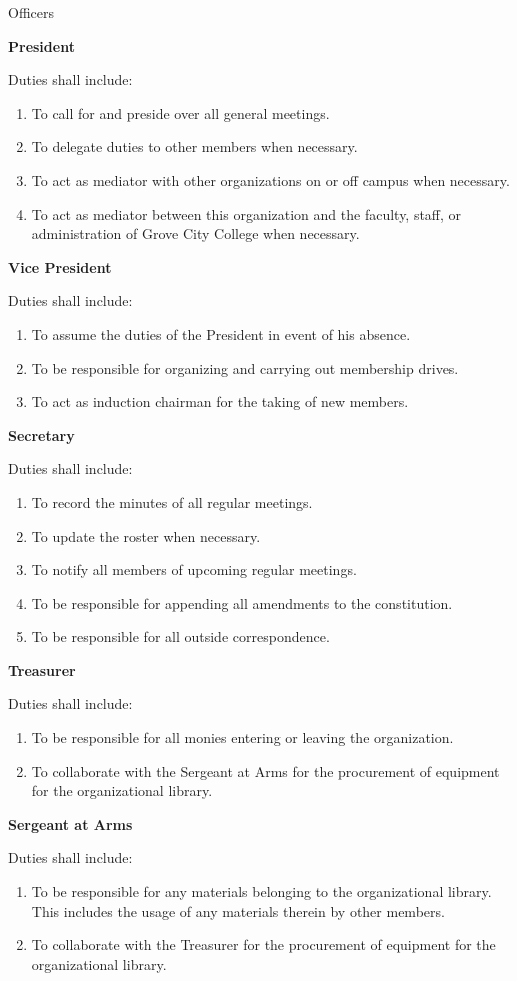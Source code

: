 {
	\begin{article}{Officers}
		\item \textbf{President}
		
		Duties shall include:
		\begin{enumerate}
			\item To call for and preside over all general meetings.
			\item To delegate duties to other members when necessary.
			\item To act as mediator with other organizations on or off campus when necessary. 
			\item To act as mediator between this organization and the faculty, staff, or administration of Grove City College when necessary.
		\end{enumerate}
		\item \textbf{Vice President}
		
		Duties shall include:
		\begin{enumerate}
			\item To assume the duties of the President in event of his absence.
			\item To be responsible for organizing and carrying out membership drives.
			\item To act as induction chairman for the taking of new members.
		\end{enumerate}
		\item \textbf{Secretary}
		
		Duties shall include:
		\begin{enumerate}
			\item To record the minutes of all regular meetings.
			\item To update the roster when necessary.
			\item To notify all members of upcoming regular meetings.
			\item To be responsible for appending all amendments to the constitution.
			\item To be responsible for all outside correspondence.
		\end{enumerate}
		\item \textbf{Treasurer}
		
		Duties shall include:
		\begin{enumerate}
			\item To be responsible for all monies entering or leaving the organization.
			\item To collaborate with the Sergeant at Arms for the procurement of equipment for the organizational library.
		\end{enumerate}
		\item \textbf{Sergeant at Arms}
		
		Duties shall include:
		\begin{enumerate}
			\item To be responsible for any materials belonging to the organizational library. This includes the usage of any materials therein by other members.
			\item To collaborate with the Treasurer for the procurement of equipment for the organizational library.
		\end{enumerate}
	\end{article}
}